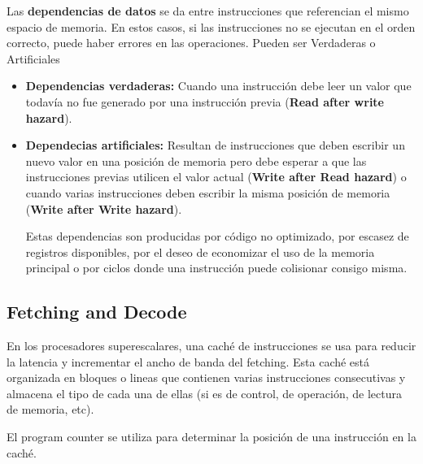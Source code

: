 Las \textbf{dependencias de datos} se da entre instrucciones que referencian el mismo espacio de memoria. En estos casos, si las instrucciones no se ejecutan en el orden correcto, puede haber errores en las operaciones. Pueden ser Verdaderas o Artificiales
\begin{itemize}
	\item \textbf{Dependencias verdaderas:} Cuando una instrucción debe leer un valor que todavía no fue generado por una instrucción previa (\textbf{Read after write hazard}).
	\item \textbf{Dependecias artificiales:} Resultan de instrucciones que deben escribir un nuevo valor en una posición de memoria pero debe esperar a que las instrucciones previas utilicen el valor actual (\textbf{Write after Read hazard}) o cuando varias instrucciones deben escribir la misma posición de memoria (\textbf{Write after Write hazard}).
	
	Estas dependencias son producidas por código no optimizado, por escasez de registros disponibles, por el deseo de economizar el uso de la memoria principal o por ciclos donde una instrucción puede colisionar consigo misma.
	
\end{itemize}


\subsection{Fetching and Decode}\label{ilp::superscalars::fetchDecode}
En los procesadores superescalares, una caché de instrucciones se usa para reducir la latencia y incrementar el ancho de banda del fetching. Esta caché está organizada en bloques o lineas que contienen varias instrucciones consecutivas y almacena el tipo de cada una de ellas (si es de control, de operación, de lectura de memoria, etc). 

El program counter se utiliza para determinar la posición de una instrucción en la caché.

